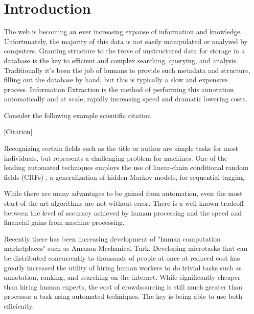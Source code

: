 \section{Introduction}

\noindent{}

\noindent{}

The web is becoming an ever increasing expanse of information and knowledge.  Unfortunately, the majority of this data is not easily manipulated or analyzed by computers.  Granting structure to the trove of unstructured data for storage in a database is the key to efficient and complex searching, querying, and analysis.  Traditionally it's been the job of humans to provide such metadata and structure, filling out the database by hand, but this is typically a slow and expensive process.  Information Extraction is the method of performing this annotation automatically and at scale, rapidly increasing speed and dramatic lowering costs.

Consider the following example scientific citation.

[Citation]

Recognizing certain fields such as the title or author are simple tasks for most individuals, but represents a challenging problem for machines.  One of the leading automated techniques employs the use of linear-chain conditional random fields (CRFs) \cite{DBLP:conf/icml/LaffertyMP01}, a generalization of hidden Markov models, for sequential tagging.  


While there are many advantages to be gained from automation, even the most start-of-the-art algorithms are not without error.  There is a well known tradeoff \cite{Quinn10crowdflow:integrating} between the level of accuracy achieved by human processing and the speed and financial gains from machine processing.  

Recently there has been increasing development of "human computation marketplaces" such as Amazon Mechanical Turk.  Developing microtasks that can be distributed concurrently to thousands of people at once at reduced cost has greatly increased the utility of hiring human workers to do trivial tasks such as annotation, ranking, and searching on the internet.  While significantly cheaper than hiring human experts, the cost of crowdsourcing is still much greater than processor a task using automated techniques.  The key is being able to use both efficiently.

